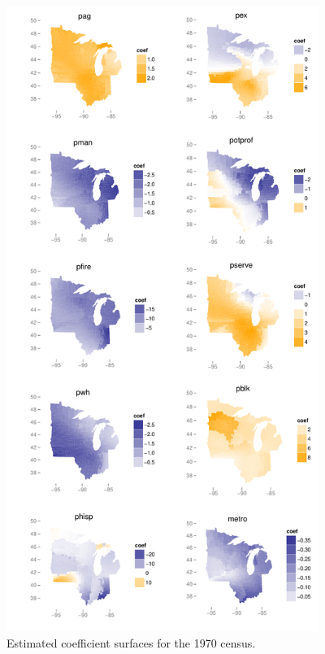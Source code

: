 	\begin{figure}
		\begin{center}
			\includegraphics[height=8in]{../../figures/poverty/1970.linear.coefficients.pdf}
			\caption{Estimated coefficient surfaces for the 1970 census.\label{fig:census-coefs-1970}}
		\end{center}
	\end{figure}
	
